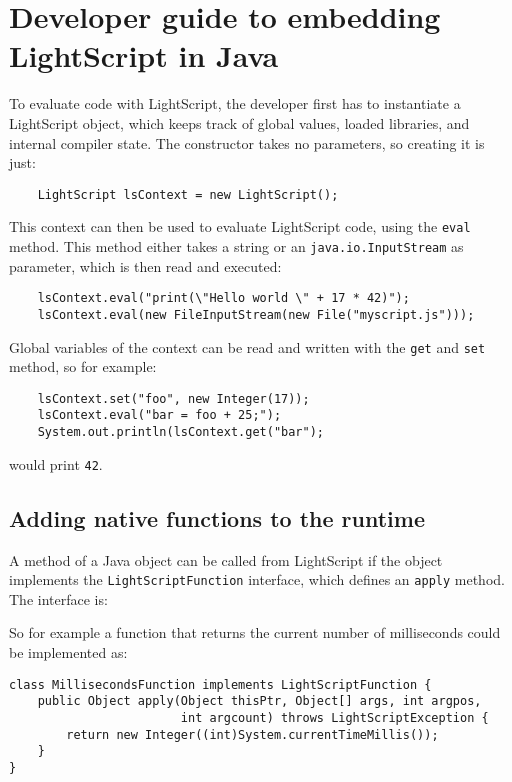 \documentclass[11pt]{report}
\begin{document}



\section{Developer guide to embedding LightScript in Java}
To evaluate code with LightScript, the developer first has to instantiate a LightScript object, which keeps track of global values, loaded libraries, and internal compiler state. The constructor takes no parameters, so creating it is just:
\begin{lstlisting}
    LightScript lsContext = new LightScript();
\end{lstlisting}
This context can then be used to evaluate LightScript code, using the \verb|eval| method. This method either takes a string or an \verb|java.io.InputStream| as parameter, which is then read and executed:
\begin{lstlisting}
    lsContext.eval("print(\"Hello world \" + 17 * 42)");
    lsContext.eval(new FileInputStream(new File("myscript.js")));
\end{lstlisting}
Global variables of the context can be read and written with the \verb|get| and \verb|set| method, so for example:
\begin{lstlisting}
    lsContext.set("foo", new Integer(17));
    lsContext.eval("bar = foo + 25;");
    System.out.println(lsContext.get("bar");
\end{lstlisting}
would print \verb|42|.

\subsection{Adding native functions to the runtime}

A method of a Java object can be called from LightScript if the object implements the \verb|LightScriptFunction| interface, which defines an \verb|apply| method.
The interface is:

So for example a function that returns the current number of milliseconds could be implemented as:
\begin{lstlisting}
class MillisecondsFunction implements LightScriptFunction {
    public Object apply(Object thisPtr, Object[] args, int argpos, 
                        int argcount) throws LightScriptException {
        return new Integer((int)System.currentTimeMillis());
    }
}
\end{lstlisting}
\end{document}
